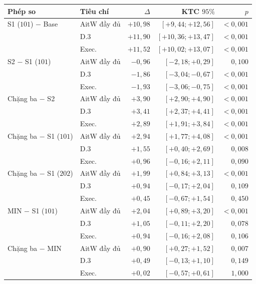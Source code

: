 \begin{table}[t]
\vspace{0.6em}
\begin{tabular}{@{}llrrr@{}}
\toprule
Phép so & Tiêu chí & $\Delta$ & KTC $95\%$ & $p$ \\
\midrule
S1 ($101$) $-$ Base & AitW đầy đủ & $+10{,}98$ & $[+9{,}44; +12{,}56]$ & $<0{,}001$ \\
 & D.3 & $+11{,}90$ & $[+10{,}36; +13{,}47]$ & $<0{,}001$ \\
 & Exec. & $+11{,}52$ & $[+10{,}02; +13{,}07]$ & $<0{,}001$ \\
\midrule
S2 $-$ S1 ($101$) & AitW đầy đủ & $-0{,}96$ & $[-2{,}18; +0{,}29]$ & $0{,}100$ \\
 & D.3 & $-1{,}86$ & $[-3{,}04; -0{,}67]$ & $<0{,}001$ \\
 & Exec. & $-1{,}93$ & $[-3{,}06; -0{,}75]$ & $<0{,}001$ \\
\midrule
Chặng ba $-$ S2 & AitW đầy đủ & $+3{,}90$ & $[+2{,}90; +4{,}90]$ & $<0{,}001$ \\
 & D.3 & $+3{,}41$ & $[+2{,}37; +4{,}41]$ & $<0{,}001$ \\
 & Exec. & $+2{,}89$ & $[+1{,}91; +3{,}84]$ & $<0{,}001$ \\
\midrule
Chặng ba $-$ S1 ($101$) & AitW đầy đủ & $+2{,}94$ & $[+1{,}77; +4{,}08]$ & $<0{,}001$ \\
 & D.3 & $+1{,}55$ & $[+0{,}40; +2{,}69]$ & $0{,}008$ \\
 & Exec. & $+0{,}96$ & $[-0{,}16; +2{,}11]$ & $0{,}090$ \\
\midrule
Chặng ba $-$ S1 ($202$) & AitW đầy đủ & $+1{,}99$ & $[+0{,}84; +3{,}13]$ & $<0{,}001$ \\
 & D.3 & $+0{,}94$ & $[-0{,}17; +2{,}04]$ & $0{,}109$ \\
 & Exec. & $+0{,}45$ & $[-0{,}67; +1{,}54]$ & $0{,}450$ \\
\midrule
MIN $-$ S1 ($101$) & AitW đầy đủ & $+2{,}04$ & $[+0{,}89; +3{,}20]$ & $<0{,}001$ \\
 & D.3 & $+1{,}05$ & $[-0{,}11; +2{,}20]$ & $0{,}078$ \\
 & Exec. & $+0{,}94$ & $[-0{,}16; +2{,}08]$ & $0{,}106$ \\
\midrule
Chặng ba $-$ MIN & AitW đầy đủ & $+0{,}90$ & $[+0{,}27; +1{,}52]$ & $0{,}007$ \\
 & D.3 & $+0{,}49$ & $[-0{,}13; +1{,}10]$ & $0{,}149$ \\
 & Exec. & $+0{,}02$ & $[-0{,}57; +0{,}61]$ & $1{,}000$ \\
\bottomrule
\end{tabular}
\end{table}
